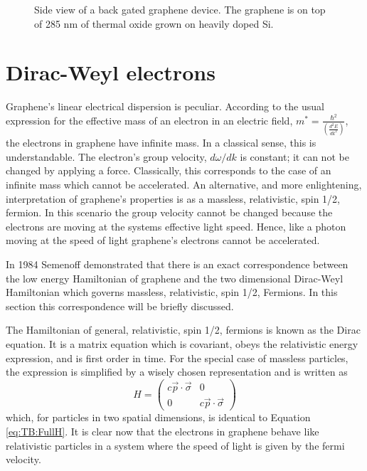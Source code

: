 \begin{figure}
	\begin{center}
	
	\end{center}
	\caption{\label{fig:TB:FET} Side view of a back gated graphene device.  The graphene is on top of 285 nm of thermal oxide grown on heavily doped Si. }	
\end{figure}

\section{Dirac-Weyl electrons}
Graphene's linear electrical dispersion is peculiar.
According to the usual expression for the effective mass of an electron in an electric field, $m^*=\frac{\hbar^2}{\left(\frac{d^2 E}{d k^2}\right)}$, \cite{Kittel2005} the electrons in graphene have infinite mass.
In a classical sense, this is understandable.
The electron's group velocity, $d \omega/d k$ is constant; it can not be changed by applying a force.
Classically, this corresponds to the case of an infinite mass which cannot be accelerated.
An alternative, and more enlightening, interpretation of graphene's properties is as a massless, relativistic, spin 1/2, fermion.
In this scenario the group velocity cannot be changed because the electrons are moving at the systems effective light speed.
Hence, like a photon moving at the speed of light graphene's electrons cannot be accelerated.

In 1984 Semenoff demonstrated that there is an exact correspondence between the low energy Hamiltonian of graphene and the two dimensional Dirac-Weyl Hamiltonian\cite{Semenoff1984} which governs massless, relativistic, spin 1/2, Fermions.
In this section this correspondence will be briefly discussed.

The Hamiltonian of general, relativistic, spin 1/2, fermions is known as the Dirac equation.
It is a matrix equation which is covariant, obeys the relativistic energy expression, and is first order in time.
For the special case of massless particles, the expression is simplified by a wisely chosen representation and is written as
\begin{equation*}
	H=\left( \begin{array}{cc}
			c \vec{p} \cdot \vec{\sigma}              & 0\\
			0              & c \vec{p} \cdot \vec{\sigma}			   	            			\end{array} \right)
\end{equation*}
which, for particles in two spatial dimensions, is identical to Equation \ref{eq:TB:FullH}.
It is clear now that the electrons in graphene behave like relativistic particles in a system where the speed of light is given by the fermi velocity.

